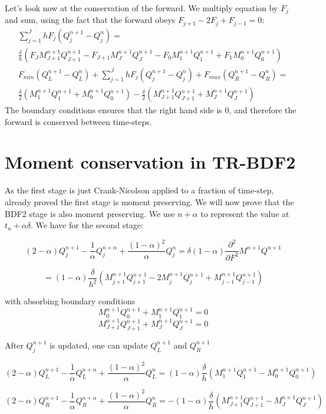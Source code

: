 \documentclass[]{rAMF2e}
\begin{document}
Let's look now at the conservation of the forward. We multiply equation by $F_j$ and sum, using the fact that the forward obeys $F_{j+1}-2F_{j}+F_{j-1}=0$:
\begin{eqnarray}
\sum_{j=1}^{J} h F_j (Q_j^{n+1}-Q_j^n) = \\ \frac{\delta}{h}\left(F_J M_{J+1}^{n+1}Q_{J+1}^{n+1}-F_{J+1}M_J^{n+1}Q_J^{n+1}-F_0 M_1^{n+1}Q_1^{n+1}+F_1 M_0^{n+1}Q_0^{n+1}\right)\\
F_{min}(Q_L^{n+1}-Q_L^n)+ \sum_{j=1}^{J} h F_j (Q_j^{n+1}-Q_j^n) +F_{max}(Q_R^{n+1}-Q_R^n) = \\ \frac{\delta}{2}\left(M_{1}^{n+1}Q_{1}^{n+1}+M_0^{n+1}Q_0^{n+1}\right)-\frac{\delta}{2}\left(M_{J+1}^{n+1}Q_{J+1}^{n+1}+M_J^{n+1}Q_J^{n+1}\right)
\end{eqnarray}
The boundary conditions ensures that the right hand side is 0, and therefore the forward is conserved between time-steps.
 
\section{Moment conservation in TR-BDF2}
As the first stage is just Crank-Nicolson applied to a fraction of time-step, \citep{hagan2013arbitrage} already proved the first stage is moment preserving. We will now prove that the BDF2 stage is also moment preserving. We use $n+\alpha$ to represent the value at $t_{n}+\alpha \delta$. We have for the second stage:

$$(2-\alpha)Q_j^{n+1}-\frac{1}{\alpha}Q_j^{n+\alpha}+\frac{(1-\alpha)^2}{\alpha}Q_j^n=\delta(1-\alpha)\frac{\partial^2}{\partial F^2}M^{n+1}Q^{n+1}$$ 

$$= (1-\alpha)\frac{\delta}{h^2}\left(M_{j+1}^{n+1}Q_{j+1}^{n+1}-2M_{j}^{n+1}Q_{j}^{n+1}+M_{j-1}^{n+1}Q_{j-1}^{n+1}\right)$$

with absorbing boundary conditions
$$M_0^{n+1}Q_0^{n+1} + M_1^{n+1}Q_1^{n+1} = 0 $$
$$M_{J+1}^{n+1}Q_{J+1}^{n+1} + M_J^{n+1}Q_J^{n+1} = 0 $$

After $Q_j^{n+1}$ is updated, one can update $Q_L^{n+1}$ and $Q_R^{n+1}$

$$(2-\alpha)Q_L^{n+1}-\frac{1}{\alpha}Q_L^{n+\alpha}+\frac{(1-\alpha)^2}{\alpha}Q_L^n=(1-\alpha)\frac{\delta}{h}\left(M_1^{n+1}Q_1^{n+1} - M_0^{n+1}Q_0^{n+1}\right)$$

$$(2-\alpha)Q_R^{n+1}-\frac{1}{\alpha}Q_R^{n+\alpha}+\frac{(1-\alpha)^2}{\alpha}Q_R^n=-(1-\alpha)\frac{\delta}{h}\left(M_{J+1}^{n+1}Q_{J+1}^{n+1} - M_J^{n+1}Q_J^{n+1}\right)$$
\end{document}
